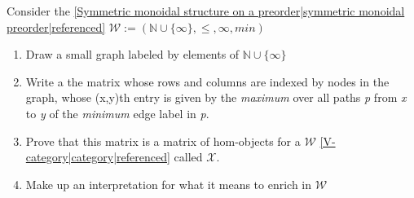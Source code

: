 
Consider the \ref{Symmetric monoidal structure on a preorder|symmetric monoidal preorder|referenced} $\mathcal{W}:=(\mathbb{N}\cup\{\infty\},\leq,\infty,min)$
    \begin{enumerate}
      \item Draw a small graph labeled by elements of $\mathbb{N}\cup\{\infty\}$
      \item Write a the matrix whose rows and columns are indexed by nodes in the graph, whose (x,y)th entry is given by the \emph{maximum} over all paths \emph{p} from \emph{x} to \emph{y} of the \emph{minimum} edge label in \emph{p}.
      \item Prove that this matrix is a matrix of hom-objects for a $\mathcal{W}$ \ref{V-category|category|referenced} called $\mathcal{X}$.
      \item Make up an interpretation for what it means to enrich in $\mathcal{W}$
    \end{enumerate}